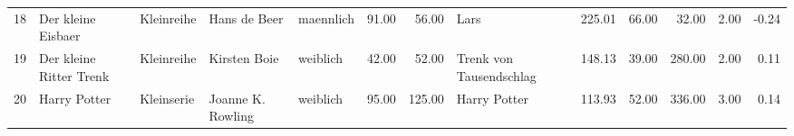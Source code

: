 \begin{sidewaystable}[ht]
\begin{center}
{\begin{tabular}{rllllrrlrrrrr}
  18 & Der kleine Eisbaer                                                                                                                                                                                                                                              & Kleinreihe & Hans de Beer                                                                                                                                                                                                                                                    & maennlich & 91.00 & 56.00 & Lars                                                                                                                                                                                                                                                            & 225.01 & 66.00 & 32.00 & 2.00 & -0.24 \\ 
  19 & Der kleine Ritter Trenk                                                                                                                                                                                                                                         & Kleinreihe & Kirsten Boie                                                                                                                                                                                                                                                    & weiblich & 42.00 & 52.00 & Trenk von Tausendschlag                                                                                                                                                                                                                                         & 148.13 & 39.00 & 280.00 & 2.00 & 0.11 \\ 
  20 & Harry Potter                                                                                                                                                                                                                                                    & Kleinserie & Joanne K. Rowling                                                                                                                                                                                                                                               & weiblich & 95.00 & 125.00 & Harry Potter                                                                                                                                                                                                                                                    & 113.93 & 52.00 & 336.00 & 3.00 & 0.14 \\ 

\end{tabular}}
\end{center}
\end{sidewaystable}
